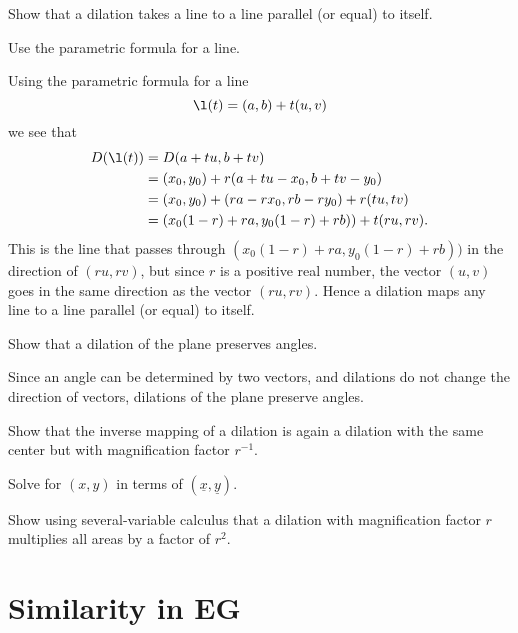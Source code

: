 \documentclass{ximera}
\begin{document}
\begin{question}
Show that a dilation takes a line to a line parallel (or equal) to
itself.
\begin{solution}
\begin{hint}
Use the parametric formula for a line.
\end{hint}
Using the parametric formula for a line
\[
\l(t) = (a,b) + t(u,v)
\]
we see that
\begin{align*}
D(\l(t)) &=D(a+tu,b+tv)\\
&= (x_0,y_0) + r(a+tu-x_0,b+tv-y_0)\\
&= (x_0,y_0) + (ra - rx_0,rb-ry_0)+ r(tu,tv)\\
&= (x_0(1-r) + ra,y_0(1-r)+rb)) + t(ru,rv). 
\end{align*}
This is the line that passes through $(x_0(1-r) + ra,y_0(1-r)+rb))$ in
the direction of $(ru,rv)$, but since $r$ is a positive real number,
the vector $(u,v)$ goes in the same direction as the vector
$(ru,rv)$. Hence a dilation maps any line to a line parallel (or
equal) to itself.
\end{solution}
\end{question}

\begin{question}
Show that a dilation of the plane preserves angles.
\begin{solution}
Since an angle can be determined by two vectors, and dilations do not
change the direction of vectors, dilations of the plane preserve
angles.
\end{solution}
\end{question}


\begin{question}
Show that the inverse mapping of a dilation is again a dilation with
the same center but with magnification factor $r^{-1}$.
\begin{solution}
\begin{hint}
Solve for $(x,y)$ in terms of $(\underline{x},\underline{y})$.
\end{hint}
\end{solution}
\end{question}


\begin{question}
Show using several-variable calculus that a dilation with
magnification factor $r$ multiplies all areas by a factor of $r^{2}$.
\end{question}



\section*{Similarity in \textbf{EG}}
\end{document}
